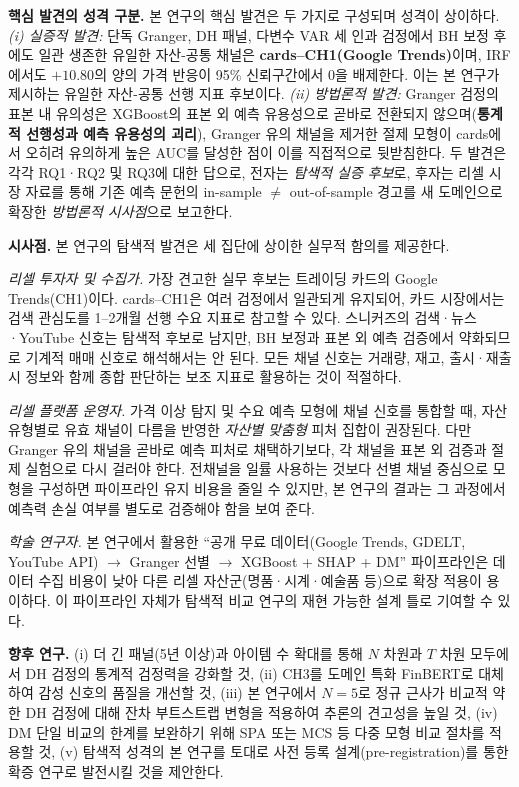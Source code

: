 \documentclass[11pt, a4paper, twocolumn]{article}
\begin{document}
\textbf{핵심 발견의 성격 구분.} 본 연구의 핵심 발견은 두 가지로
구성되며 성격이 상이하다. \emph{(i) 실증적 발견:} 단독 Granger, DH 패널,
다변수 VAR 세 인과 검정에서 BH 보정 후에도 일관 생존한 유일한
자산-공통 채널은 \textbf{cards--CH1(Google Trends)}이며, IRF에서도
$+10.80$의 양의 가격 반응이 95\% 신뢰구간에서 0을 배제한다. 이는 본
연구가 제시하는 유일한 자산-공통 선행 지표 후보이다.
\emph{(ii) 방법론적 발견:} Granger 검정의 표본 내 유의성은 XGBoost의
표본 외 예측 유용성으로 곧바로 전환되지 않으며(\textbf{통계적 선행성과
예측 유용성의 괴리}), Granger 유의 채널을 제거한 절제 모형이 cards에서
오히려 유의하게 높은 AUC를 달성한 점이 이를 직접적으로 뒷받침한다.
두 발견은 각각 RQ1·RQ2 및 RQ3에 대한 답으로, 전자는 \emph{탐색적
실증 후보}로, 후자는 리셀 시장 자료를 통해 기존 예측 문헌의 in-sample
$\neq$ out-of-sample 경고\citep{welchgoyal2008}를 새 도메인으로 확장한
\emph{방법론적 시사점}으로 보고한다.

\textbf{시사점.} 본 연구의 탐색적 발견은 세 집단에 상이한 실무적 함의를
제공한다.

\emph{리셀 투자자 및 수집가.} 가장 견고한 실무 후보는 트레이딩 카드의
Google Trends(CH1)이다. cards--CH1은 여러 검정에서 일관되게 유지되어,
카드 시장에서는 검색 관심도를 1--2개월 선행 수요 지표로 참고할 수 있다.
스니커즈의 검색·뉴스·YouTube 신호는 탐색적 후보로 남지만, BH 보정과
표본 외 예측 검증에서 약화되므로 기계적 매매 신호로 해석해서는 안 된다.
모든 채널 신호는 거래량, 재고, 출시·재출시 정보와 함께 종합 판단하는
보조 지표로 활용하는 것이 적절하다.

\emph{리셀 플랫폼 운영자.} 가격 이상 탐지 및 수요 예측 모형에 채널 신호를
통합할 때, 자산 유형별로 유효 채널이 다름을 반영한 \emph{자산별 맞춤형}
피처 집합이 권장된다. 다만 Granger 유의 채널을 곧바로 예측 피처로 채택하기보다,
각 채널을 표본 외 검증과 절제 실험으로 다시 걸러야 한다. 전채널을 일률
사용하는 것보다 선별 채널 중심으로 모형을 구성하면 파이프라인 유지 비용을
줄일 수 있지만, 본 연구의 결과는 그 과정에서 예측력 손실 여부를 별도로
검증해야 함을 보여 준다.

\emph{학술 연구자.} 본 연구에서 활용한 ``공개 무료 데이터(Google Trends,
GDELT, YouTube API) $\to$ Granger 선별 $\to$ XGBoost + SHAP + DM'' 파이프라인은
데이터 수집 비용이 낮아 다른 리셀 자산군(명품·시계·예술품 등)으로 확장
적용이 용이하다. 이 파이프라인 자체가 탐색적 비교 연구의 재현 가능한
설계 틀로 기여할 수 있다.

\textbf{향후 연구.} (i) 더 긴 패널(5년 이상)과 아이템 수 확대를 통해
$N$ 차원과 $T$ 차원 모두에서 DH 검정의 통계적 검정력을 강화할 것,
(ii) CH3를 도메인 특화 FinBERT로 대체하여 감성 신호의 품질을 개선할
것, (iii) 본 연구에서 $N=5$로 정규 근사가 비교적 약한 DH 검정에
대해 잔차 부트스트랩 변형\citep{dumitrescuhurlin2012}을 적용하여 추론의
견고성을 높일 것, (iv) DM 단일 비교의 한계를 보완하기 위해
SPA\citep{hansen2005} 또는 MCS\citep{hansenlundenason2011} 등 다중 모형
비교 절차를 적용할 것, (v) 탐색적 성격의 본 연구를 토대로 사전 등록
설계(pre-registration)를 통한 확증 연구로 발전시킬 것을 제안한다.
\end{document}
